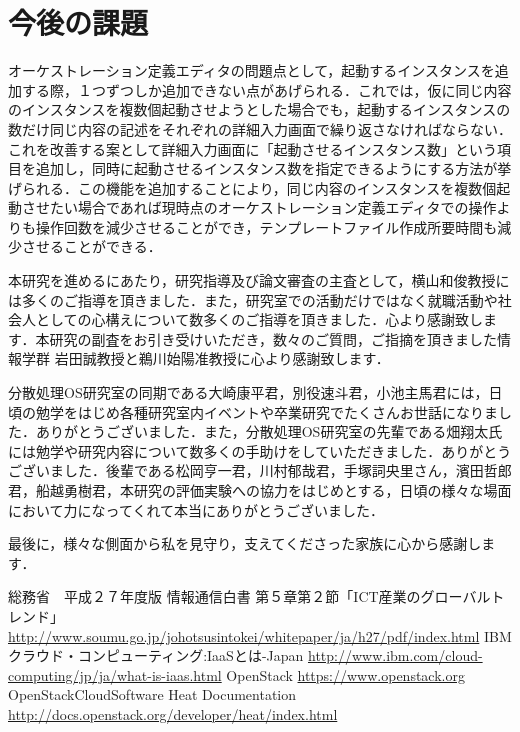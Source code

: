 \documentclass[mingoth]{kut-paper}		%
\begin{document}
	\section{今後の課題}
	オーケストレーション定義エディタの問題点として，起動するインスタンスを追加する際，１つずつしか追加できない点があげられる．これでは，仮に同じ内容のインスタンスを複数個起動させようとした場合でも，起動するインスタンスの数だけ同じ内容の記述をそれぞれの詳細入力画面で繰り返さなければならない．これを改善する案として詳細入力画面に「起動させるインスタンス数」という項目を追加し，同時に起動させるインスタンス数を指定できるようにする方法が挙げられる．この機能を追加することにより，同じ内容のインスタンスを複数個起動させたい場合であれば現時点のオーケストレーション定義エディタでの操作よりも操作回数を減少させることができ，テンプレートファイル作成所要時間も減少させることができる．
	


\begin{acknowledgement}
本研究を進めるにあたり，研究指導及び論文審査の主査として，横山和俊教授には多くのご指導を頂きました．また，研究室での活動だけではなく就職活動や社会人としての心構えについて数多くのご指導を頂きました．心より感謝致します．本研究の副査をお引き受けいただき，数々のご質問，ご指摘を頂きました情報学群 岩田誠教授と鵜川始陽准教授に心より感謝致します．

分散処理OS研究室の同期である大崎康平君，別役速斗君，小池主馬君には，日頃の勉学をはじめ各種研究室内イベントや卒業研究でたくさんお世話になりました．ありがとうございました．また，分散処理OS研究室の先輩である畑翔太氏には勉学や研究内容について数多くの手助けをしていただきました．ありがとうございました．後輩である松岡亨一君，川村郁哉君，手塚詞央里さん，濱田哲郎君，船越勇樹君，本研究の評価実験への協力をはじめとする，日頃の様々な場面において力になってくれて本当にありがとうございました．

最後に，様々な側面から私を見守り，支えてくださった家族に心から感謝します．
%
\end{acknowledgement}


\begin{thebibliography}{99}
%
総務省　平成２７年度版 情報通信白書 第５章第２節「ICT産業のグローバルトレンド」 				\url{http://www.soumu.go.jp/johotsusintokei/whitepaper/ja/h27/pdf/index.html}
IBMクラウド・コンピューティング:IaaSとは-Japan
\url{http://www.ibm.com/cloud-computing/jp/ja/what-is-iaas.html}
OpenStack
\url{https://www.openstack.org}
OpenStackCloudSoftware Heat Documentation
\url{http://docs.openstack.org/developer/heat/index.html}
\end{thebibliography}



%

%
\end{document}
